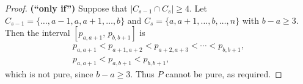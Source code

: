 \documentclass[10pt,a4paper]{amsart}
\begin{document}
\begin{proof}
\smallskip

\noindent
{\bf (``only if'')} Suppose that $|C_{s-1} \cap C_s| \geq 4$.
Let
$C_{s-1} = \{\ldots, a-1, a, a+1, \ldots, b\}$ and
$C_s = \{a, a+1, \ldots, b, \ldots, n\}$ with $b - a \geq 3$.
Then the interval $[p_{a,a+1},\, p_{b,b+1}]$ is 
\begin{eqnarray*}
&p_{a,a+1} < p_{a+1,a+2} < p_{a+2,a+3} < \cdots < p_{b,b+1},&\\
&p_{a,a+1} < p_{a,b+1} < p_{b,b+1},&
\end{eqnarray*}
which is not pure, since $b - a \geq 3$.
Thus $P$ cannot be pure, as required.
\end{proof}
\end{document}
